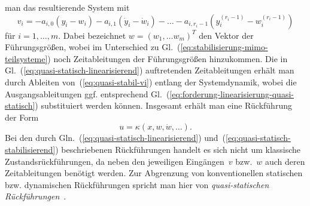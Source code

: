 man das resultierende System mit 
\begin{equation}
v_{i}=-a_{i,0}\left(y_{i}-w_{i}\right)-a_{i,1}\left(\dot{y}_{i}-\dot{w}_{i}\right)-\ldots-a_{i,r_{i}-1}\left(y_{i}^{(r_{i}-1)}-w_{i}^{(r_{i}-1)}\right)\label{eq:quasi-stabil-vi}
\end{equation}
für $i=1,\ldots,m$. Dabei bezeichnet $w=(w_{1},\ldots w_{m})^{T}$
den Vektor der Führungsgrößen, wobei im Unterschied zu Gl.~(\ref{eq:stabilisierung-mimo-teilsysteme})
noch Zeitableitungen der Führungsgrößen hinzukommen. Die in Gl.~(\ref{eq:quasi-statisch-linearisierend})
auftretenden Zeitableitungen erhält man durch Ableiten von~(\ref{eq:quasi-stabil-vi})
entlang der Systemdynamik, wobei die Ausgangsableitungen ggf. entsprechend
Gl.~(\ref{eq:forderung-linearisierung-quasi-statisch}) substituiert
werden können. Insgesamt erhält man eine Rückführung der Form 
\begin{equation}
u=\kappa(x,w,\dot{w},\ldots).\label{eq:quasi-statisch-stabilisierend}
\end{equation}
Bei den durch Gln.~(\ref{eq:quasi-statisch-linearisierend}) und~(\ref{eq:quasi-statisch-stabilisierend})
beschriebenen Rückführungen handelt es sich nicht um klassische Zustandsrückführungen,
da neben den jeweiligen Eingängen~$v$ bzw.~$w$ auch deren Zeitableitungen
benötigt werden. Zur Abgrenzung von konventionellen statischen bzw.
dynamischen Rückführungen spricht man hier von \emph{quasi-statischen
Rückführungen}~\cite{rudolph2003habil,rudolph2005at}.

